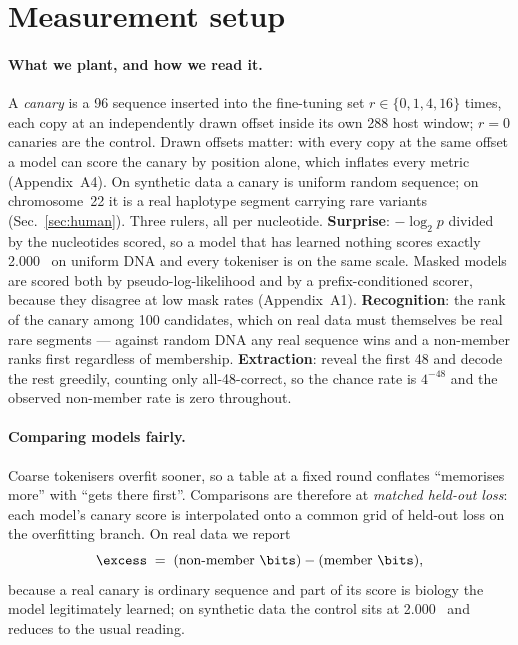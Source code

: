 \section{Measurement setup}
\label{sec:setup}

\paragraph{What we plant, and how we read it.}
A \emph{canary} is a 96\nt{} sequence inserted into the fine-tuning set $r \in \{0,1,4,16\}$ times,
each copy at an independently drawn offset inside its own 288\nt{} host window; $r=0$ canaries are
the control. Drawn offsets matter: with every copy at the same offset a model can score the canary
by position alone, which inflates every metric (Appendix~A4). On synthetic data a canary is uniform
random sequence; on chromosome~22 it is a real haplotype segment carrying rare variants
(Sec.~\ref{sec:human}). Three rulers, all per nucleotide. \textbf{Surprise}: $-\log_2 p$ divided by
the nucleotides scored, so a model that has learned nothing scores exactly 2.000~\bits{} on uniform
DNA and every tokeniser is on the same scale. Masked models are scored both by pseudo-log-likelihood
\cite{salazar2020pll} and by a prefix-conditioned scorer, because they disagree at low mask rates
(Appendix~A1). \textbf{Recognition}: the rank of the canary among 100 candidates, which on real data
must themselves be real rare segments --- against random DNA any real sequence wins and a non-member
ranks first regardless of membership. \textbf{Extraction}: reveal the first 48\nt{} and decode the
rest greedily, counting only all-48-correct, so the chance rate is $4^{-48}$ and the observed
non-member rate is zero throughout.

\paragraph{Comparing models fairly.}
Coarse tokenisers overfit sooner, so a table at a fixed round conflates ``memorises more'' with
``gets there first''. Comparisons are therefore at \emph{matched held-out loss}: each model's canary
score is interpolated onto a common grid of held-out loss on the overfitting branch. On real data we
report
\[
  \excess \;=\; (\text{non-member \bits}) - (\text{member \bits}),
\]
because a real canary is ordinary sequence and part of its score is biology the model legitimately
learned; on synthetic data the control sits at 2.000~\bits{} and \excess{} reduces to the usual
reading.

